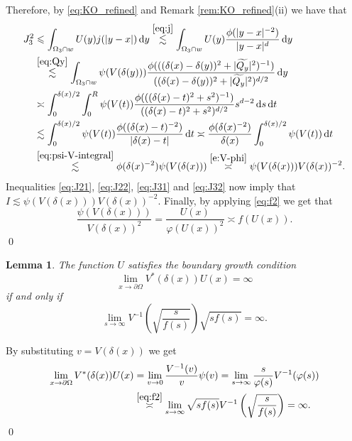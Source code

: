 \documentclass[a4paper,12pt,draft]{article}
\theoremstyle{plain}
\newtheorem{lemma}[thm]{Lemma}
\theoremstyle{definition}
\numberwithin{equation}{section}
\renewcommand{\leq}{\leqslant}
\newcommand{\1}{1}
\newcommand{\ds} {\, \mathrm{d}s}
\newcommand{\dt} {\, \mathrm{d}t}
\newcommand{\dy} {\, \mathrm{d}y}
\begin{document}
Therefore, by \eqref{eq:KO_refined} and Remark \ref{rem:KO_refined}(ii) we have that
\begin{align}
 J_3^2&\leq\int_{\Omega_3\cap w}U(y)j(|y-x|)\dy\overset{\eqref{eq:j}}{\lesssim}\int_{\Omega_3\cap w}U(y)\frac{\phi(|y-x|^{-2})}{|y-x|^d}\dy\nonumber\\
 &\overset{\eqref{eq:Qy}}{\lesssim}\int_{\Omega_3\cap w}\psi(V(\delta(y)))\frac{\phi(((\delta(x)-\delta(y))^2+|\widetilde{Q_y}|^2)^{-1})}{((\delta(x)-\delta(y))^2+|\widetilde{Q_y}|^2)^{d/2}}\dy\nonumber\\
 &\asymp\int_{0}^{\delta(x)/2}\int_0^R\psi(V(t))\frac{\phi(((\delta(x)-t)^2+s^2)^{-1})}{((\delta(x)-t)^2+s^2)^{d/2}}s^{d-2}\ds\dt\nonumber\\
 &\lesssim\int_{0}^{\delta(x)/2}\psi(V(t))\frac{\phi((\delta(x)-t)^{-2})}{|\delta(x)-t|}\dt\asymp \frac{\phi(\delta(x)^{-2})}{\delta(x)}\int_{0}^{\delta(x)/2}\psi(V(t))\dt\nonumber\\
 &\overset{\eqref{eq:psi-V-integral}}{\lesssim} \phi(\delta(x)^{-2})\psi(V(\delta(x)))\overset{\eqref{e:V-phi}}{\asymp} \psi(V(\delta(x)))V(\delta(x))^{-2}.\label{eq:J32}
\end{align}
Inequalities \eqref{eq:J21}, \eqref{eq:J22}, \eqref{eq:J31} and \eqref{eq:J32} now imply that $I\lesssim \psi(V(\delta(x)))V(\delta(x))^{-2}$.
Finally, by applying \eqref{eq:f2} we get that
\begin{equation*}
\frac{\psi(V(\delta(x)))}{V(\delta(x))^2}=\frac{U(x)}{\varphi(U(x))^2}\asymp f(U(x)).
\end{equation*}
\qed


\begin{lemma}\label{lem:boundary_rate}
 The function $U$ satisfies the boundary growth condition 
\begin{equation*}
 \lim_{x\to\partial\Omega} V^*(\delta(x))U(x)=\infty
\end{equation*}
if and only if 
\begin{equation}\label{eq:growth}
\lim_{s\to\infty} V^{-1}\left(\sqrt{\frac{s}{f(s)}}\right)\sqrt{sf(s)}=\infty.
\end{equation}

\end{lemma}
\proof
By substituting $v=V(\delta(x))$ we get
\begin{align*}
 \lim_{x\to\partial\Omega} V^*(\delta(x))U(x)&=\lim_{v\to 0}\frac{V^{-1}(v)}{v}\psi(v)=\lim_{s\to \infty}\frac{s}{\varphi(s)}V^{-1}(\varphi(s))\\
 &\overset{\eqref{eq:f2}}{\asymp}\lim_{s\to \infty}\sqrt{sf(s)}V^{-1}\left(\sqrt{\frac{s}{f(s)}}\right)=\infty.
 \end{align*}
\qed
\end{document}
